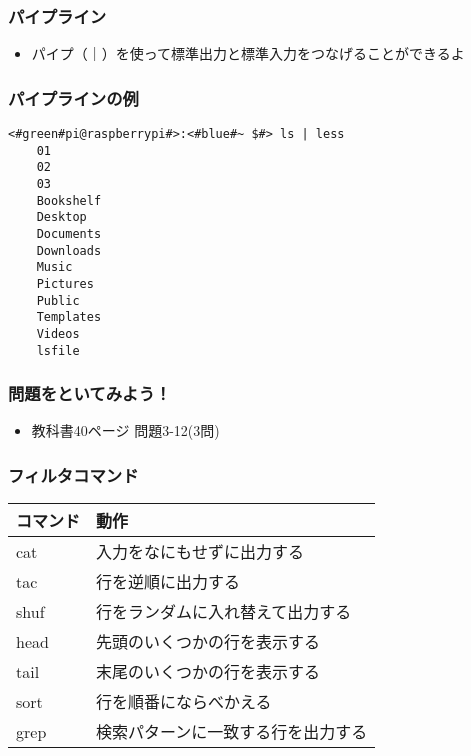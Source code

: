 \begin{frame}
    \frametitle{パイプライン}
    \begin{itemize}
        \item パイプ（｜）を使って標準出力と標準入力をつなげることができるよ
    \end{itemize}
    \begin{figure}
        \centering
        
    \end{figure}
\end{frame}

\begin{frame}[fragile]
    \frametitle{パイプラインの例}
    \begin{lstlisting}[title=lsコマンドの出力をパイプでlessコマンドに渡す, label=redirectCat]
    <#green#pi@raspberrypi#>:<#blue#~ $#> ls | less
    01
    02
    03
    Bookshelf
    Desktop
    Documents
    Downloads
    Music
    Pictures
    Public
    Templates
    Videos
    lsfile
    \end{lstlisting}
\end{frame}

\begin{frame}
    \frametitle{問題をといてみよう！}
    \begin{itemize}
        \item 教科書40ページ 問題3-12(3問)
    \end{itemize}
\end{frame}

\begin{frame}
    \frametitle{フィルタコマンド}
    \begin{tabular}{ll}
        コマンド & 動作                               \\ \hline
        cat      & 入力をなにもせずに出力する         \\
        tac      & 行を逆順に出力する                 \\
        shuf     & 行をランダムに入れ替えて出力する   \\
        head     & 先頭のいくつかの行を表示する       \\
        tail     & 末尾のいくつかの行を表示する       \\
        sort     & 行を順番にならべかえる             \\
        grep     & 検索パターンに一致する行を出力する \\ \hline
    \end{tabular}
\end{frame}

